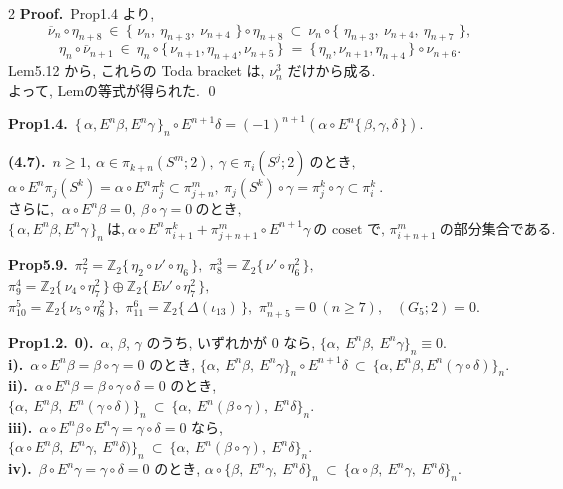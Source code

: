 \documentclass[10pt, leqno]{ltjsarticle}
\newcommand{\Ex}{E}        %
\newcommand{\toda}[1]{\{\,#1\,\}}              %
\newcommand{\todai}[2][]{\{\,#2\,\}_{#1}}      %
\newcommand{\gen}[1]{\{\,#1\,\}}       %
\newcommand{\pis}[2]{\pi_{#1}(#2)}       %
\newcommand{\pit}[2]{\pi_{#1}^{#2}}
\numberwithin{equation}{section}
\theoremstyle{plain}
\theoremstyle{definition}
\theoremstyle{remark}
\begin{document}
\begin{paracol}{2}
\noindent
\textbf{Proof.}\
Prop1.4 より,
\[
\overline\nu_n\circ \eta_{n+8}\ \in\
\toda{\,\nu_n,\ \eta_{n+3},\ \nu_{n+4}\,}\circ \eta_{n+8}
\ \subset\ \nu_n\circ \toda{\,\eta_{n+3},\ \nu_{n+4},\ \eta_{n+7}\,}, 
\]
\[
\eta_n\circ\overline{\nu}_{n+1} \ \in\
\eta_n\circ\todai[]{\nu_{n+1}, \eta_{n+4}, \nu_{n+5}}\ = \
\todai[]{\eta_n, \nu_{n+1}, \eta_{n+4}}\circ\nu_{n+6} .
\]
Lem5.12 から, 
これらの Toda bracket は, \(\nu_n^{3}\) だけから成る. \\
よって, Lemの等式が得られた. 
\qed

\switchcolumn

\noindent
\textbf{Prop1.4.}\
\(\todai[n]{\alpha, E^n\beta, E^n\gamma}\circ E^{n+1}\delta
= (-1)^{n+1}(\alpha\circ E^n\toda{\beta, \gamma, \delta})\).

\noindent
\textbf{(4.7).}\
\(n\ge1, \ \alpha\in\pis{k+n}{S^m; 2},\ \gamma\in\pis{i}{S^j; 2}
    \ \text{のとき, }\)\\
\(\alpha\circ E^n\pis{j}{S^k} = \alpha\circ E^n \pit{j}{k}
  \subset \pit{j+n}{m},
  \ \pis{j}{S^k}\circ\gamma = \pit{j}{k}\circ\gamma \subset\pit{i}{k}\ . \)\\
\(\text{さらに, }\ \alpha\circ E^n\beta=0,\ \beta\circ\gamma = 0 \ \text{のとき, }\)\\
\(\todai[n]{\alpha, E^n\beta, E^n\gamma}\ \text{は,}\
  \alpha\circ E^n\pit{i+1}{k} + \pit{j+n+1}{m}\circ E^{n+1}\gamma\
  \text{の coset で, }\pit{i+n+1}{m} \ \text{の部分集合である. }\)

\noindent
\textbf{Prop5.9.}\
\(\pi^{2}_{7}=\mathbb Z_2\gen{\eta_{2}\circ\nu'\circ\eta_6},\) \quad
\(\pi^{3}_{8}=\mathbb Z_2\gen{\nu'\circ\eta_6^2},\) \quad
\(\pi^{4}_{9}=\mathbb Z_2\gen{\nu_{4}\circ\eta_7^2}\oplus \mathbb Z_2\gen{E\nu'\circ\eta_7^2},\) \\
\(\pi^{5}_{10}=\mathbb Z_2\gen{\nu_{5}\circ\eta_8^2},\) \quad
\(\pi^{6}_{11}=\mathbb Z_2\gen{\Delta(\iota_{13})},\) \quad
\(\pi^{n}_{n+5}=0\ (n\ge7),\) \
\((G_{5};2)=0.\)

\noindent
\textbf{Prop1.2.}\
\textbf{0).}\ $\alpha$, $\beta$, $\gamma$ のうち, いずれかが $0$ なら,
\(
\{\alpha,\ \Ex^n\beta,\ \Ex^n\gamma\}_n\equiv0.
\)\\
\textbf{i).}\ $\alpha\circ \Ex^n\beta=\beta\circ\gamma=0$ のとき,
\(
\{\alpha,\ \Ex^n\beta,\ \Ex^n\gamma\}_n\circ\Ex^{n+1}\delta\ \subset\ \{\alpha,\Ex^n \beta, \Ex^n(\gamma\circ\delta)\}_n.
\)\\
\textbf{ii).}\ $\alpha\circ \Ex^n\beta=\beta\circ\gamma\circ\delta=0$ のとき,
\(
\{\alpha,\ \Ex^n\beta,\ \Ex^n(\gamma\circ\delta)\}_n\ \subset\ \{\alpha,\ \Ex^n(\beta\circ\gamma),\ \Ex^n\delta\}_n .
\)\\
\textbf{iii).}\ $\alpha\circ\Ex^n\beta\circ\Ex^n\gamma=\gamma\circ\delta=0$ なら,
\(
\{\alpha\circ\Ex^n\beta,\ \Ex^n\gamma,\ \Ex^n\delta)\}_n\ \subset\ \{\alpha,\ \Ex^n(\beta\circ\gamma),\ \Ex^n\delta\}_n .
\)\\
\textbf{iv).}\ $\beta\circ\Ex^n\gamma=\gamma\circ\delta=0$ のとき,
\(
\alpha\circ\{\beta,\ \Ex^n\gamma,\ \Ex^n\delta\}_n\ \subset\ \{\alpha\circ\beta,\ \Ex^n\gamma,\ \Ex^n\delta\}_n .
\)


\end{paracol}
\end{document}
